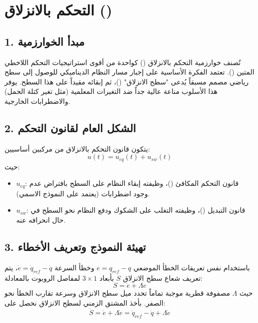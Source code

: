 \section{التحكم بالانزلاق ()}
\label{sec:smc_control}

\subsection*{1. مبدأ الخوارزمية}
تُصنف خوارزمية التحكم بالانزلاق () كواحدة من أقوى استراتيجيات التحكم اللاخطي المتين (). تعتمد الفكرة الأساسية على إجبار مسار النظام الديناميكي للوصول إلى سطح رياضي مصمم مسبقاً يُدعى "سطح الانزلاق" ()، ثم إبقائه مقيداً على هذا السطح. يوفر هذا الأسلوب مناعة عالية جداً ضد التغيرات المعلمية (مثل تغير كتلة الحمل) والاضطرابات الخارجية.

\subsection*{2. الشكل العام لقانون التحكم}
يتكون قانون التحكم بالانزلاق من مركبين أساسيين:
\begin{equation}
u(t) = u_{eq}(t) + u_{sw}(t)
\end{equation}
حيث:
\begin{itemize}
    \item $u_{eq}$: قانون التحكم المكافئ ()، وظيفته إبقاء النظام على السطح بافتراض عدم وجود اضطرابات (يعتمد على النموذج الاسمي).
    \item $u_{sw}$: قانون التبديل ()، وظيفته التغلب على الشكوك ودفع النظام نحو السطح في حال انحرافه عنه.
\end{itemize}

\subsection*{3. تهيئة النموذج وتعريف الأخطاء}
باستخدام نفس تعريفات الخطأ الموضعي $e = q_{ref} - q$ وخطأ السرعة $\dot{e} = \dot{q}_{ref} - \dot{q}$، يتم تعريف شعاع سطح الانزلاق $S$ بأبعاد $3 \times 1$ لمفاصل الروبوت بالمعادلة:
\begin{equation}
S = \dot{e} + \Lambda e
\end{equation}
حيث $\Lambda$ مصفوفة قطرية موجبة تماماً تحدد ميل سطح الانزلاق وسرعة تقارب الخطأ نحو الصفر. 
بأخذ المشتق الزمني لسطح الانزلاق نحصل على:
\begin{equation}
\dot{S} = \ddot{e} + \Lambda \dot{e} = \ddot{q}_{ref} - \ddot{q} + \Lambda \dot{e}
\end{equation}

